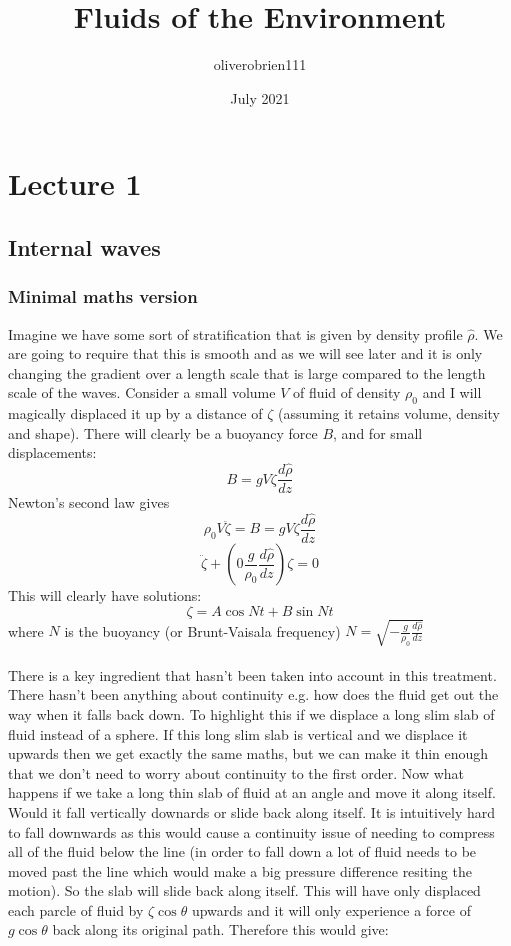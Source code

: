 \documentclass{article}
\title{Fluids of the Environment}
\author{oliverobrien111 }
\date{July 2021}
\begin{document}
\maketitle

\section{Lecture 1}
\subsection{Internal waves}
\subsubsection{Minimal maths version}
Imagine we have some sort of stratification that is given by density profile $\hat \rho$. We are going to require that this is smooth and as we will see later and it is only changing the gradient over a length scale that is large compared to the length scale of the waves. Consider a small volume $V$ of fluid of density $\rho_0$ and I will magically displaced it up by a distance of $\zeta$ (assuming it retains volume, density and shape). There will clearly be a buoyancy force $B$, and for small displacements:
$$
B = g V \zeta \frac{d\hat \rho}{d z}  $$
Newton's second law gives
$$
\rho_0 V \ddot \zeta = B = g V \zeta \frac{d\hat \rho}{d z} 
$$
$$
\ddot \zeta + (0 \frac{g}{\rho_0} \frac{d \hat \rho}{dz} ) \zeta = 0
$$
This will clearly have solutions:
$$
\zeta = A \cos Nt + B \sin Nt
$$
where $N$ is the buoyancy (or Brunt-Vaisala frequency) $N = \sqrt{-\frac{g}{\rho_0} \frac{d\hat \rho}{dz}}$\\\\
There is a key ingredient that hasn't been taken into account in this treatment. There hasn't been anything about continuity e.g. how does the fluid get out the way when it falls back down. To highlight this if we displace a long slim slab of fluid instead of a sphere. If this long slim slab is vertical and we displace it upwards then we get exactly the same maths, but we can make it thin enough that we don't need to worry about continuity to the first order. Now what happens if we take a long thin slab of fluid at an angle and move it along itself. Would it fall vertically downards or slide back along itself. It is intuitively hard to fall downwards as this would cause a continuity issue of needing to compress all of the fluid below the line (in order to fall down a lot of fluid needs to be moved past the line which would make a big pressure difference resiting the motion). So the slab will slide back along itself. This will have only displaced each parcle of fluid by $\zeta \cos \theta$ upwards and it will only experience a force of $g \cos \theta$ back along its original path. Therefore this would give:
\end{document}
